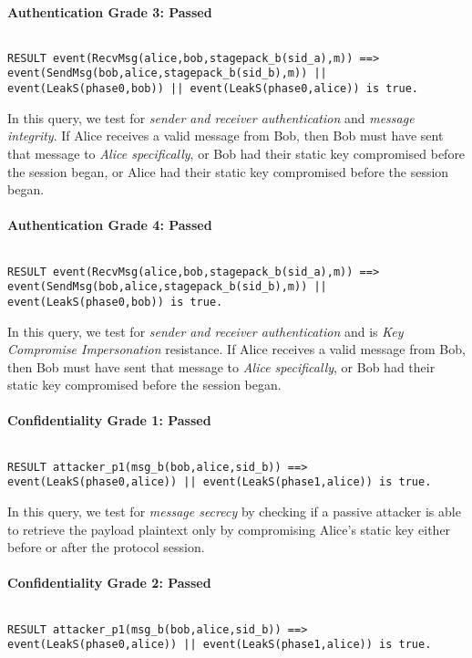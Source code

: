 \paragraph{Authentication Grade 3: Passed}$ $
\begin{lstlisting}
RESULT event(RecvMsg(alice,bob,stagepack_b(sid_a),m)) ==> event(SendMsg(bob,alice,stagepack_b(sid_b),m)) || event(LeakS(phase0,bob)) || event(LeakS(phase0,alice)) is true.
\end{lstlisting}

In this query, we test for \emph{sender and receiver authentication} and \emph{message integrity}. If Alice receives a valid message from Bob, then Bob must have sent that message to \emph{Alice specifically}, or Bob had their static key compromised before the session began, or Alice had their static key compromised before the session began.


\paragraph{Authentication Grade 4: Passed}$ $
\begin{lstlisting}
RESULT event(RecvMsg(alice,bob,stagepack_b(sid_a),m)) ==> event(SendMsg(bob,alice,stagepack_b(sid_b),m)) || event(LeakS(phase0,bob)) is true.
\end{lstlisting}

In this query, we test for \emph{sender and receiver authentication} and is \emph{Key Compromise Impersonation} resistance. If Alice receives a valid message from Bob, then Bob must have sent that message to \emph{Alice specifically}, or Bob had their static key compromised before the session began.


\paragraph{Confidentiality Grade 1: Passed}$ $
\begin{lstlisting}
RESULT attacker_p1(msg_b(bob,alice,sid_b)) ==> event(LeakS(phase0,alice)) || event(LeakS(phase1,alice)) is true.
\end{lstlisting}

In this query, we test for \emph{message secrecy} by checking if a passive attacker is able to retrieve the payload plaintext only by compromising Alice's static key either before or after the protocol session.


\paragraph{Confidentiality Grade 2: Passed}$ $
\begin{lstlisting}
RESULT attacker_p1(msg_b(bob,alice,sid_b)) ==> event(LeakS(phase0,alice)) || event(LeakS(phase1,alice)) is true.
\end{lstlisting}

